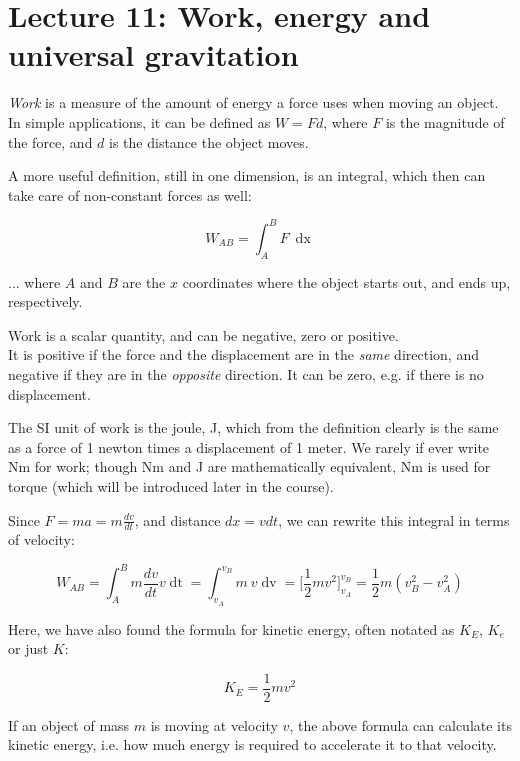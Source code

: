 \section{Lecture 11: Work, energy and universal gravitation}

\emph{Work} is a measure of the amount of energy a force uses when moving an object. In simple applications, it can be defined as $W = F d$, where $F$ is the magnitude of the force, and $d$ is the distance the object moves.

A more useful definition, still in one dimension, is an integral, which then can take care of non-constant forces as well:

\begin{equation}
W_{AB} = \int_A^B F\ \mathop{dx}
\end{equation}

... where $A$ and $B$ are the $x$ coordinates where the object starts out, and ends up, respectively.

Work is a scalar quantity, and can be negative, zero or positive.\\
It is positive if the force and the displacement are in the \emph{same} direction, and negative if they are in the \emph{opposite} direction. It can be zero, e.g. if there is no displacement.

The SI unit of work is the joule, J, which from the definition clearly is the same as a force of 1 newton times a displacement of 1 meter. We rarely if ever write Nm for work; though Nm and J are mathematically equivalent, Nm is used for torque (which will be introduced later in the course).

Since $\displaystyle F = m a = m \frac{dv}{dt}$, and distance $dx = v dt$, we can rewrite this integral in terms of velocity:

\begin{equation}
W_{AB} = \int_A^B m \frac{dv}{dt} v \mathop{dt} = \int_{v_A}^{v_B} m\ v \mathop{dv} = \Big[ \frac{1}{2} m v^2 \Big]_{v_A}^{v_B} = \frac{1}{2} m \left(v_B^2 - v_A^2\right)
\end{equation}

Here, we have also found the formula for kinetic energy, often notated as $K_E$, $K_e$ or just $K$:

\begin{equation}
K_E = \frac{1}{2} m v^2
\end{equation}

If an object of mass $m$ is moving at velocity $v$, the above formula can calculate its kinetic energy, i.e. how much energy is required to accelerate it to that velocity.

